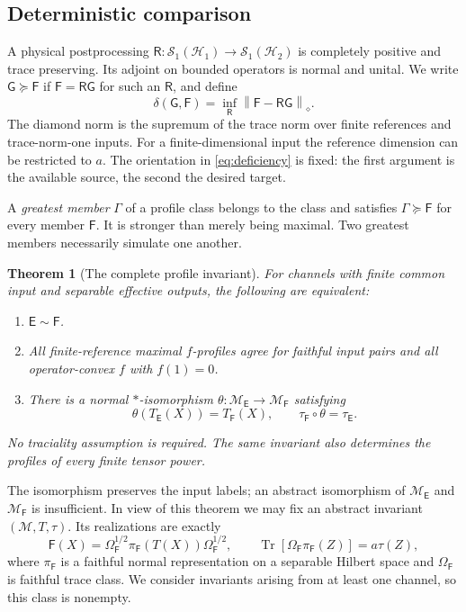 \documentclass[11pt,reqno]{amsart}
\newtheorem{theorem}{Theorem}[section]
\theoremstyle{definition}
\theoremstyle{remark}
\numberwithin{equation}{section}
\DeclareMathOperator{\Tr}{Tr}
\newcommand{\M}{\mathcal M}
\newcommand{\HH}{\mathcal H}
\newcommand{\Sone}{\mathcal S_1}
\newcommand{\E}{\mathsf E}
\newcommand{\F}{\mathsf F}
\newcommand{\G}{\mathsf G}
\newcommand{\R}{\mathsf R}
\newcommand{\norm}[1]{\left\lVert#1\right\rVert}
\newcommand{\defic}{\delta}
\begin{document}
\subsection{Deterministic comparison}

A physical postprocessing $\R:\Sone(\HH_1)\to\Sone(\HH_2)$ is completely positive and trace preserving. Its adjoint on bounded operators is normal and unital. We write $\G\succeq\F$ if $\F=\R\G$ for such an $\R$, and define
\begin{equation}\label{eq:deficiency}
 \defic(\G,\F)=\inf_\R\norm{\F-\R\G}_\diamond.
\end{equation}
The diamond norm is the supremum of the trace norm over finite references and trace-norm-one inputs. For a finite-dimensional input the reference dimension can be restricted to $a$. The orientation in \eqref{eq:deficiency} is fixed: the first argument is the available source, the second the desired target.

A \emph{greatest member} $\Gamma$ of a profile class belongs to the class and satisfies $\Gamma\succeq\F$ for every member $\F$. It is stronger than merely being maximal. Two greatest members necessarily simulate one another.

\begin{theorem}[The complete profile invariant]\label{thm:classification}
For channels with finite common input and separable effective outputs, the following are equivalent:
\begin{enumerate}
 \item $\E\sim\F$.
 \item All finite-reference maximal $f$-profiles agree for faithful input pairs and all operator-convex $f$ with $f(1)=0$.
 \item There is a normal $*$-isomorphism $\theta:\M_\E\to\M_\F$ satisfying
 \[
  \theta(T_\E(X))=T_\F(X),\qquad
  \tau_\F\circ\theta=\tau_\E.
 \]
\end{enumerate}
No traciality assumption is required. The same invariant also determines the profiles of every finite tensor power.
\end{theorem}

The isomorphism preserves the input labels; an abstract isomorphism of $\M_\E$ and $\M_\F$ is insufficient. In view of this theorem we may fix an abstract invariant $(\M,T,\tau)$. Its realizations are exactly
\begin{equation}\label{eq:all-realizations}
 \F(X)=\Omega_\F^{1/2}\pi_\F(T(X))\Omega_\F^{1/2},\qquad
 \Tr[\Omega_\F\pi_\F(Z)]=a\tau(Z),
\end{equation}
where $\pi_\F$ is a faithful normal representation on a separable Hilbert space and $\Omega_\F$ is faithful trace class. We consider invariants arising from at least one channel, so this class is nonempty.
\end{document}
